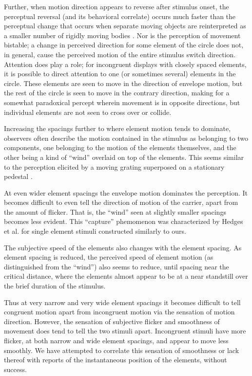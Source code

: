 \documentclass[english,jou]{article}
\newenvironment{lyxgreyedout}
  {\textcolor{note_fontcolor}\bgroup\ignorespaces}
  {\ignorespacesafterend\egroup}
\begin{document}
\begin{lyxgreyedout}
Further, when motion direction appears to reverse after stimulus onset,
the perceptual reversal (and its behavioral correlate) occurs much
faster than the perceptual change that occurs when separate moving
objects are reinterpreted as a smaller number of rigidly moving bodies
\citep{Anstis:2011vn}\emph{.} Nor is the perception of movement bistable;
a change in perceived direction for some element of the circle does
not, in general, cause the perceived motion of the entire stimulus
switch direction. Attention does play a role; for incongruent displays
with closely spaced elements, it is possible to direct attention to
one (or sometimes several) elements in the circle. These elements
are seen to move in the direction of envelope motion, but the rest
of the circle is seen to move in the contrary direction, making for
a somewhat paradoxical percept wherein movement is in opposite directions,
but individual elements are not seen to cross over or collide.%
\end{lyxgreyedout}


Increasing the spacings further to where element motion tends to dominate,
observers often describe the motion contained in the stimulus as belonging
to two components, one belonging to the motion of the elements themselves,
and the other being a kind of ``wind'' overlaid on top of the elements.
This seems similar to the perception elicited by a moving grating
superposed on a stationary pedestal \citep{Lu:2001fv}.

At even wider element spacings the envelope motion dominates the perception.
It becomes difficult to even tell the direction of motion of the carrier,
apart from the amount of flicker. That is, the ``wind'' seen at
slightly smaller spacings becomes less evident. This ``capture''
phemomenon was characterized by Hedges et al.  for single element
stimuli constructed similarly to ours. 

The subjective speed of the elements also changes with the element
spacing. As element spacing is reduced, the perceived speed of element
motion (as distinguished from the ``wind'') also seems to reduce,
until spacing near the critical distance, where the elements almost
appear to be at a near standstill over the brief duration of the stimulus.

Thus at very narrow and very wide element spacings it becomes difficult
to tell congruent motion apart from incongruent motion via the sensation
of motion direction. However, the sensation of subjective flicker
and smoothness of movement does tend to tell the two stimuli apart.
Incongruent stimuli have more flicker, at both narrow and wide element
spacings, and appear to move less smoothly. We have attempted to correlate
this sensation of smoothness or lack thereof with reports of the instantaneous
position of the elements,  without success.
\end{document}
